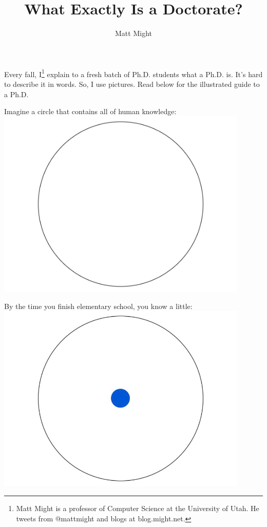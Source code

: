 \documentclass{beamer}
\title[Doctorate] %
{What Exactly Is a Doctorate?}
\author[Matt Might]
{Matt Might}
\begin{document}
\titlepage

\begin{frame}
	Every fall, I\footnote{Matt Might is a professor of Computer Science at the University of Utah. He tweets from @mattmight and blogs at blog.might.net.} explain to a fresh batch of Ph.D. students what a Ph.D. is. It's hard to describe it in words. So, I use pictures. Read below for the illustrated guide to a Ph.D.
\end{frame}

\begin{frame}
	Imagine a circle that contains all of human knowledge:
	\center\includegraphics[width=0.9\textwidth]{figures/fig_1}
\end{frame}

\begin{frame}
	By the time you finish elementary school, you know a little:
	\center\includegraphics[width=0.9\textwidth]{figures/fig_2}
\end{frame}
\end{document}

